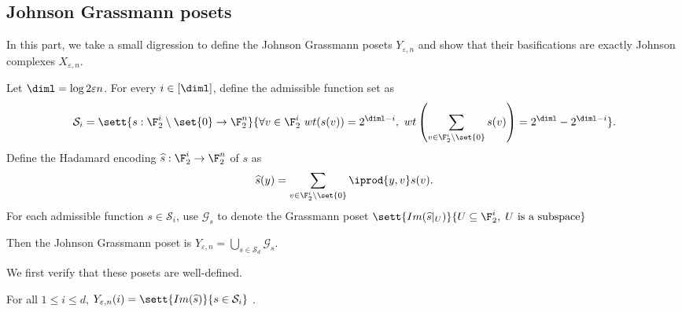 

\subsection{Johnson Grassmann posets}
\label{sec:JGposet}
In this part, we take a small digression to define the Johnson Grassmann posets $Y_{\varepsilon,n}$ and show that their basifications are exactly Johnson complexes $X_{\varepsilon, n}$.

\begin{definition}\label{def:Johnson-admissible-sets}
Let $\diml = \log 2\varepsilon n$. For every $i\in[\diml]$, define the admissible function set as \[\mathcal{S}_i  = \sett{s: \F_2^i\setminus \set{0} \to \F_2^n}{\forall v\in \F_2^i~ wt(s(v)) = 2^{\diml - i},~ wt\left(\sum_{v\in \F_2^i \setminus \set{0}} s(v)\right) = 2^{\diml} - 2^{\diml - i}}.\] 
Define the Hadamard encoding $\widehat{s}:\F_2^i \to \F_2^n$ of $s$ as 
\[\widehat{s}(y) = \sum_{v \in \F_2^i\setminus \set{0}} \iprod{y,v}s(v).\]
For each admissible function $s\in \mathcal{S}_i$, use $\mathcal{G}_{s}$ to denote the Grassmann poset $ \sett{Im(\widehat{s}|_U)}{U \subseteq \F_2^i, \; U \text{ is a subspace}}$

Then the Johnson Grassmann poset is $Y_{\varepsilon,n} = \bigcup_{s\in \mathcal{S}_d} \mathcal{G}_{s}$.
\end{definition}

We first verify that these posets are well-defined. 
\begin{claim} For all $1\le i\le d$,
    $Y_{\varepsilon,n}(i) = \sett{Im(\widehat{s})}{s\in  \mathcal{S}_i}$ . 
\end{claim}
 
